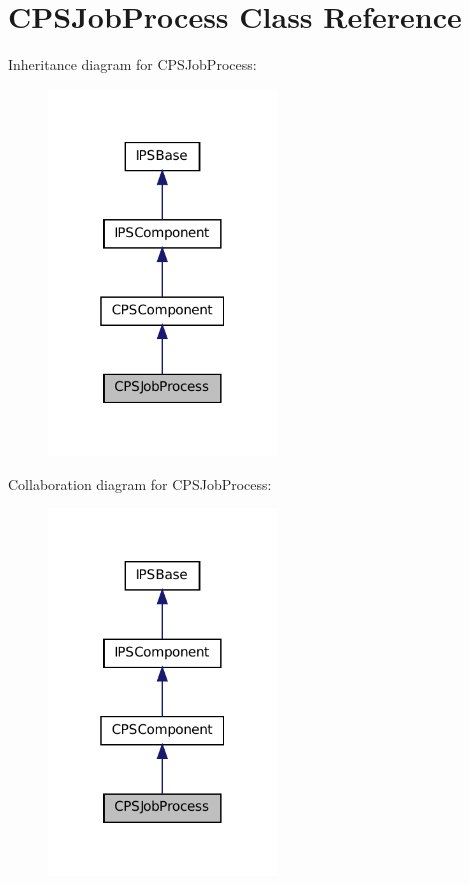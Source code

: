 \hypertarget{classCPSJobProcess}{
\section{CPSJobProcess Class Reference}
\label{classCPSJobProcess}
}


Inheritance diagram for CPSJobProcess:\nopagebreak
\begin{figure}[H]
\begin{center}
\leavevmode
\includegraphics[width=172pt]{classCPSJobProcess__inherit__graph}
\end{center}
\end{figure}


Collaboration diagram for CPSJobProcess:\nopagebreak
\begin{figure}[H]
\begin{center}
\leavevmode
\includegraphics[width=172pt]{classCPSJobProcess__coll__graph}
\end{center}
\end{figure}
